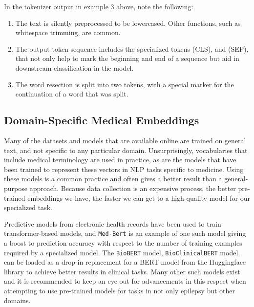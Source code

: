 In the tokenizer output in example 3 above, note the following:
\begin{enumerate}
  \item The text is silently preprocessed to be lowercased. Other functions, such as whitespace trimming, are common.
  \item The output token sequence includes the specialized tokens (CLS), and (SEP), that not only help to mark the beginning and end of a sequence but aid in downstream classification in the model.
  \item The word resection is split into two tokens, with a special marker for the continuation of a word that was split.
\end{enumerate}

\subsection{Domain-Specific Medical Embeddings} \label{Domain-Specific Medical Embeddings}

Many of the datasets and models that are available online are trained on general text, and not specific to any particular domain.
Unsurprisingly, vocabularies that include medical terminology are used in practice, as are the models that have been trained to
represent these vectors in NLP tasks specific to medicine. Using these models is a common practice and often gives a better result
than a general-purpose approach. Because data collection is an expensive process, the better pre-trained embeddings we have, the
faster we can get to a high-quality model for our specialized task.

Predictive models from electronic health records have been used to train transformer-based models, and \texttt{Med-Bert}\cite{rasmy2020medbert}
is an example of one such model giving a boost to prediction accuracy with respect to the number of training examples required by a
specialized model. The \texttt{BioBERT}\cite{DBLP:journals/corr/abs-1901-08746} model,  \texttt{Bio\textunderscore ClinicalBERT}\cite{https://doi.org/10.48550/arxiv.1904.03323} model,
can be loaded as a drop-in replacement for a BERT model from the Huggingface library to achieve better results in clinical tasks. Many other such models
exist and it is recommended to keep an eye out for advancements in this respect when attempting to use pre-trained models for tasks
in not only epilepsy but other domains.
